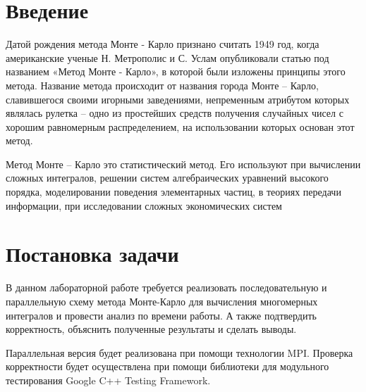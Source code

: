 \documentclass{report}
\begin{document}
\setcounter{page}{2}

\tableofcontents
\newpage

\section*{Введение}
\par Датой рождения метода Монте - Карло признано считать 1949 год, когда американские ученые Н. Метрополис и С. Услам опубликовали статью под названием «Метод Монте - Карло», в которой были изложены принципы этого метода. Название метода происходит от названия города Монте – Карло, славившегося своими игорными заведениями, непременным атрибутом которых являлась рулетка – одно из простейших средств получения случайных чисел с хорошим равномерным распределением, на использовании которых основан этот метод.

\par Метод Монте – Карло это статистический метод. Его используют при вычислении сложных интегралов, решении систем алгебраических уравнений высокого порядка, моделировании поведения элементарных частиц, в теориях передачи информации, при исследовании сложных экономических систем
\newpage

\section*{Постановка задачи}
\par В данном лабораторной работе требуется реализовать последовательную и параллельную схему метода Монте-Карло для вычисления многомерных интегралов и  провести анализ по времени работы. А также подтвердить корректность, объяснить полученные результаты и сделать выводы.
\par Параллельная версия будет реализована при помощи технологии MPI. Проверка корректности будет осуществлена при помощи библиотеки для модульного тестирования Google C++ Testing Framework.
\newpage

\end{document}

